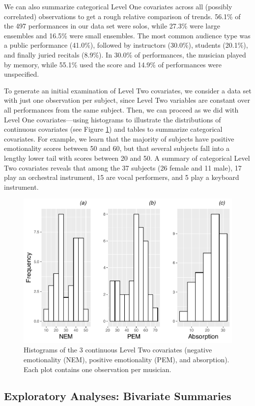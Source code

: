 \documentclass[
]{krantz}
\begin{document}
We can also summarize categorical Level One covariates across all (possibly correlated) observations to get a rough relative comparison of trends. 56.1\% of the 497 performances in our data set were solos, while 27.3\% were large ensembles and 16.5\% were small ensembles. The most common audience type was a public performance (41.0\%), followed by instructors (30.0\%), students (20.1\%), and finally juried recitals (8.9\%). In 30.0\% of performances, the musician played by memory, while 55.1\% used the score and 14.9\% of performances were unspecified.

To generate an initial examination of Level Two covariates, we consider a data set with just one observation per subject, since Level Two variables are constant over all performances from the same subject. Then, we can proceed as we did with Level One covariates---using histograms to illustrate the distributions of continuous covariates (see Figure \ref{fig:mli-histmat1}) and tables to summarize categorical covariates. For example, we learn that the majority of subjects have positive emotionality scores between 50 and 60, but that several subjects fall into a lengthy lower tail with scores between 20 and 50. A summary of categorical Level Two covariates reveals that among the 37 subjects (26 female and 11 male), 17 play an orchestral instrument, 15 are vocal performers, and 5 play a keyboard instrument.

\begin{figure}

{\centering \includegraphics[width=0.6\linewidth]{bookdown-BeyondMLR_files/figure-latex/mli-histmat1-1} 

}

\caption{Histograms of the 3 continuous Level Two covariates (negative emotionality (NEM), positive emotionality (PEM), and absorption).  Each plot contains one observation per musician.}\label{fig:mli-histmat1}
\end{figure}

\hypertarget{explore2}{%
\subsection{Exploratory Analyses: Bivariate Summaries}\label{explore2}}
\end{document}
